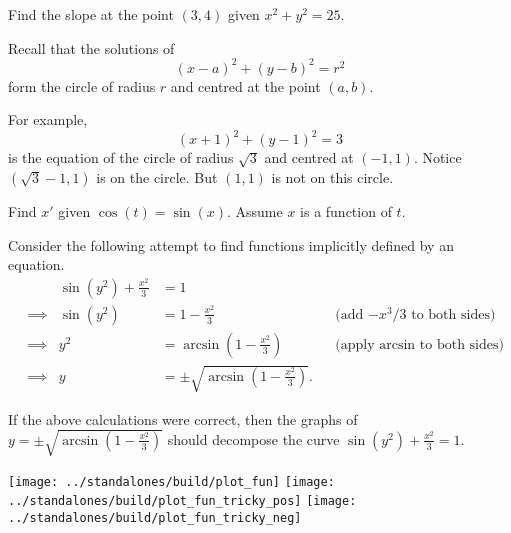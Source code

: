 \documentclass[../main.tex]{subfiles}
\begin{document}
\begin{example}
  Find the slope at the point \((3,4)\) given \(x^{2} + y^{2} = 25\). 

  \begin{mdframed}[style=sidenote]
    \footnotesize 
    Recall that the solutions of \[ (x - a)^{2} + (y - b)^{2} = r^{2} \] form the circle of radius \(r\) and centred at the point \((a,b)\).
    \bigskip

    For example, \[ (x+1)^{2} + (y-1)^{2} = 3 \] is the equation of the circle of radius \(\sqrt{3}\) and centred at \((-1,1)\). Notice \((\sqrt{3}-1,1)\) is on the circle. But \((1,1)\) is not on this circle.
  \end{mdframed}

\end{example}
\clearpage

\begin{example}
  Find \(x'\) given \(\cos(t) = \sin(x)\). Assume \(x\) is a function of \(t\).
\end{example}
\clearpage


\begin{example}
  Consider the following attempt to find functions implicitly defined by an equation.
  \begin{align*}
    && \sin(y^{2}) + \frac{x^{2}}{3} &= 1 \\[3ex]
    &\implies& \sin(y^{2}) &= 1 - \frac{x^{2}}{3} &&\text{(add \(-x^{3}/3\) to both sides)}\\[3ex]
    &\implies& y^{2} &= \arcsin\left( 1 - \frac{x^{2}}{3} \right) &&\text{(apply \(\arcsin\) to both sides)} \\[3ex]
    &\implies& y &= \pm \sqrt{\arcsin\left(1 - \frac{x^{2}}{3}\right)}.
  \end{align*}

  If the above calculations were correct, then the graphs of \(y = \pm \sqrt{\arcsin\left(1 - \frac{x^{2}}{3}\right)}\) should decompose the curve \(\sin(y^{2}) + \frac{x^{2}}{3} = 1\).
  
  \centerline{
    \texttt{[image: ../standalones/build/plot\_fun]}
    \texttt{[image: ../standalones/build/plot\_fun\_tricky\_pos]}
    \texttt{[image: ../standalones/build/plot\_fun\_tricky\_neg]}
  }
\end{example}
\clearpage
\end{document}
